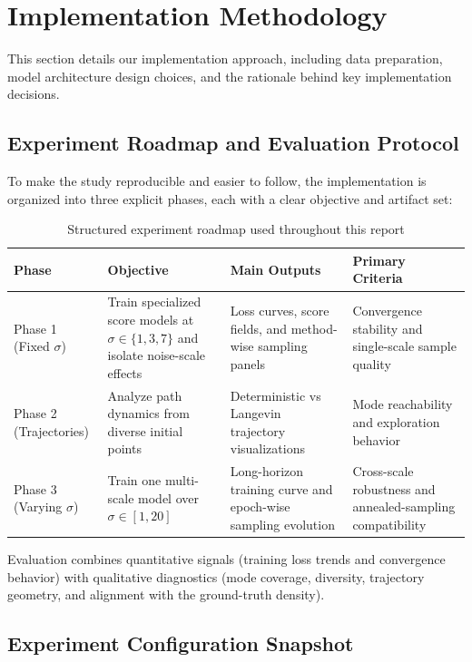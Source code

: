 \documentclass[journal]{IEEEtran}
\begin{document}
\section{Implementation Methodology}

This section details our implementation approach, including data preparation, model architecture design choices, and the rationale behind key implementation decisions.

\subsection{Experiment Roadmap and Evaluation Protocol}

To make the study reproducible and easier to follow, the implementation is organized into three explicit phases, each with a clear objective and artifact set:

\begin{table}[t]
\centering
\small
\setlength{\tabcolsep}{3pt}
\begin{tabular}{p{}p{}p{}p{}}
\toprule
Phase & Objective & Main Outputs & Primary Criteria \\
\midrule
Phase 1 (Fixed $\sigma$) &
Train specialized score models at $\sigma \in \{1,3,7\}$ and isolate noise-scale effects &
Loss curves, score fields, and method-wise sampling panels &
Convergence stability and single-scale sample quality \\
\midrule
Phase 2 (Trajectories) &
Analyze path dynamics from diverse initial points &
Deterministic vs Langevin trajectory visualizations &
Mode reachability and exploration behavior \\
\midrule
Phase 3 (Varying $\sigma$) &
Train one multi-scale model over $\sigma \in [1,20]$ &
Long-horizon training curve and epoch-wise sampling evolution &
Cross-scale robustness and annealed-sampling compatibility \\
\bottomrule
\end{tabular}
\normalsize
\caption{Structured experiment roadmap used throughout this report}
\label{tab:roadmap}
\end{table}

Evaluation combines quantitative signals (training loss trends and convergence behavior) with qualitative diagnostics (mode coverage, diversity, trajectory geometry, and alignment with the ground-truth density).

\subsection{Experiment Configuration Snapshot}
\end{document}
